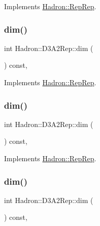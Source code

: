 Implements \mbox{\hyperlink{structHadron_1_1RepRep_a92c8802e5ed7afd7da43ccfd5b7cd92b}{Hadron\+::\+Rep\+Rep}}.

\mbox{\label{structHadron_1_1D3A2Rep_a38d0163b1fb9994be68c43d2bfc90ce4}} 
\subsubsection{\texorpdfstring{dim()}{dim()}\hspace{0.1cm}{\footnotesize\ttfamily [3/5]}}
{\footnotesize\ttfamily int Hadron\+::\+D3\+A2\+Rep\+::dim (\begin{DoxyParamCaption}{ }\end{DoxyParamCaption}) const\hspace{0.3cm}{\ttfamily [inline]}, {\ttfamily [virtual]}}



Implements \mbox{\hyperlink{structHadron_1_1RepRep_a92c8802e5ed7afd7da43ccfd5b7cd92b}{Hadron\+::\+Rep\+Rep}}.

\mbox{\label{structHadron_1_1D3A2Rep_a38d0163b1fb9994be68c43d2bfc90ce4}} 
\subsubsection{\texorpdfstring{dim()}{dim()}\hspace{0.1cm}{\footnotesize\ttfamily [4/5]}}
{\footnotesize\ttfamily int Hadron\+::\+D3\+A2\+Rep\+::dim (\begin{DoxyParamCaption}{ }\end{DoxyParamCaption}) const\hspace{0.3cm}{\ttfamily [inline]}, {\ttfamily [virtual]}}



Implements \mbox{\hyperlink{structHadron_1_1RepRep_a92c8802e5ed7afd7da43ccfd5b7cd92b}{Hadron\+::\+Rep\+Rep}}.

\mbox{\label{structHadron_1_1D3A2Rep_a38d0163b1fb9994be68c43d2bfc90ce4}} 
\subsubsection{\texorpdfstring{dim()}{dim()}\hspace{0.1cm}{\footnotesize\ttfamily [5/5]}}
{\footnotesize\ttfamily int Hadron\+::\+D3\+A2\+Rep\+::dim (\begin{DoxyParamCaption}{ }\end{DoxyParamCaption}) const\hspace{0.3cm}{\ttfamily [inline]}, {\ttfamily [virtual]}}



